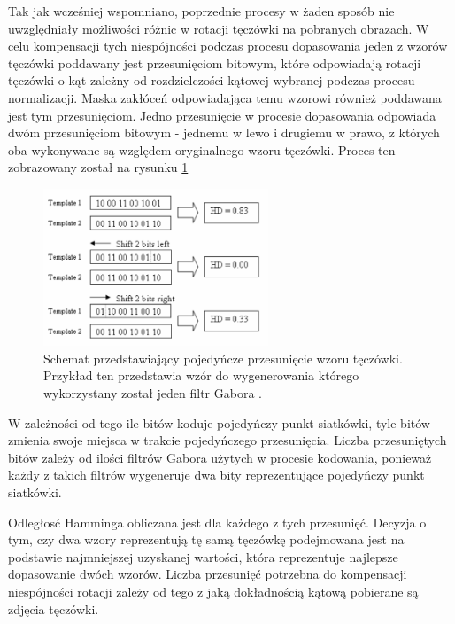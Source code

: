 Tak jak wcześniej wspomniano, poprzednie procesy w żaden sposób nie uwzględniały możliwości różnic
w rotacji tęczówki na pobranych obrazach. W celu kompensacji tych niespójności podczas procesu
dopasowania jeden z wzorów tęczówki poddawany jest przesunięciom bitowym, które odpowiadają rotacji
tęczówki o kąt zależny od rozdzielczości kątowej wybranej podczas procesu normalizacji. Maska zakłóceń
odpowiadająca temu wzorowi również poddawana jest tym przesunięciom.
Jedno przesunięcie w procesie dopasowania odpowiada dwóm przesunięciom bitowym - jednemu w lewo i
drugiemu w prawo, z których oba wykonywane są względem oryginalnego wzoru tęczówki. Proces ten
zobrazowany został na rysunku \ref{fig:matchingShifting}

\begin{figure}
  \centering
  \includegraphics[width=0.6\textwidth]{images/matching/shifting.png}
  \caption{Schemat przedstawiający pojedyńcze przesunięcie wzoru tęczówki. Przykład ten przedstawia
  wzór do wygenerowania którego wykorzystany został jeden filtr Gabora \cite{masek}.}
  \label{fig:matchingShifting}
\end{figure}

W zależności od tego ile bitów koduje pojedyńczy punkt siatkówki, tyle bitów zmienia swoje miejsca
w trakcie pojedyńczego przesunięcia. Liczba przesuniętych bitów zależy od ilości filtrów Gabora
użytych w procesie kodowania, ponieważ każdy z takich filtrów wygeneruje dwa bity reprezentujące
pojedyńczy punkt siatkówki.

Odległos\'c Hamminga obliczana jest dla każdego z tych przesunię\'c. Decyzja o tym, czy dwa wzory
reprezentują tę samą tęczówkę podejmowana jest na podstawie najmniejszej uzyskanej wartości,
która reprezentuje najlepsze dopasowanie dwóch wzorów. Liczba przesunię\'c potrzebna do kompensacji
niespójności rotacji zależy od tego z jaką dokładnością kątową pobierane są zdjęcia tęczówki.
